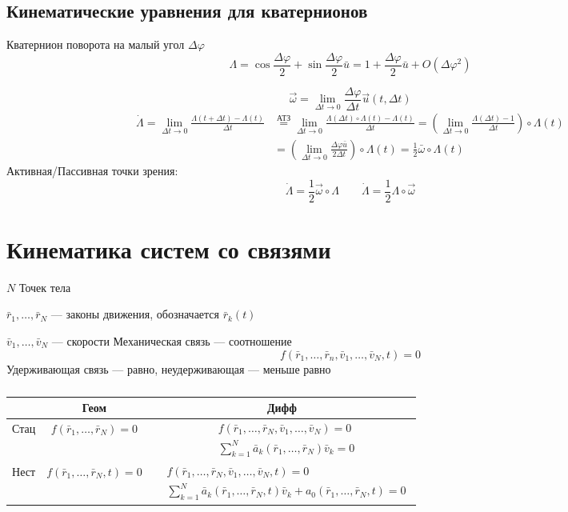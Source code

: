\documentclass[crop=false]{standalone}
\begin{document}
\subsection{Кинематические уравнения для кватернионов}
\keypoint Кватернион поворота на малый угол $\Delta \varphi$
\[\Lambda = \cos \frac{\Delta \varphi}{2} + \sin \frac{\Delta \varphi}{2} \bar u = 1 + \frac{\Delta \varphi}{2} \bar u + O(\Delta \varphi^2)\]

\[\boxed{ \vec \omega = \lim_{\Delta t \to 0} \frac{\Delta \varphi}{\Delta t} \vec u(t , \Delta t)} \]
\[
\begin{aligned}
\dot \Lambda = \lim_{\Delta t \to 0} \frac{\Lambda(t + \Delta t) - \Lambda(t)}{\Delta t} &\stackrel{\text{АТЗ}}{=} \lim_{\Delta t \to 0} \frac{\Lambda(\Delta t) \circ \Lambda(t) - \Lambda(t)}{\Delta t} = \left(\lim_{\Delta t \to 0} \frac{\Lambda(\Delta t) -1 }{\Delta t}\right)\circ \Lambda(t) \\ 
&= \left( \lim_{\Delta t \to 0} \frac{\Delta \varphi \bar u}{2 \Delta t}\right) \circ \Lambda(t) = \frac{1}{2} \bar \omega \circ \Lambda(t)
\end{aligned}
\]
Активная/Пассивная точки зрения:
\[
\boxed{
\dot \Lambda = \frac{1}{2} \vec \omega  \circ \Lambda
}
\qquad
\boxed{
\dot \Lambda = \frac{1}{2} \Lambda \circ \vec \omega 
}
\]

\section{Кинематика систем со связями}
$N$ Точек тела

$\bar r_1, \dots , \bar r_N$ — законы движения, обозначается $\bar r_k(t)$

$\bar v_1, \dots , \bar v_N$ — скорости
\Def Механическая связь — соотношение
\[f (\bar r_1 , \dots, \bar r_n , \bar v_1, \dots , \bar v_N, t) = 0\]
Удерживающая связь — равно, неудерживающая — меньше равно

\begin{table}[H]
    \centering
    \begin{tabular}{c|c|c}
        & Геом & Дифф \\
        \hline
        Стац & $f(\bar r_1, \dots , \bar r_N) = 0$ &$\begin{aligned} &f(\bar r_1, \dots , \bar r_N, \bar v_1, \dots , \bar v_N) = 0 \\ &\sum^N_{k=1} \bar a_k (\bar r_1, \dots, \bar r_N) \bar v_k = 0 \end{aligned}$\\ %
        \hline
        Нест & $f(\bar r_1, \dots, \bar r_N, t) = 0$ & $\begin{aligned} &f(\bar r_1, \dots ,\bar r_N , \bar v_1, \dots , \bar v_N, t) = 0 \\ &\sum^N_{k=1} \bar a_k (\bar r_1, \dots, \bar r_N, t) \bar v_k + a_0 (\bar r_1, \dots ,\bar r_N, t) = 0 \end{aligned}$
    \end{tabular}
    \caption{}
\end{table}
\end{document}
